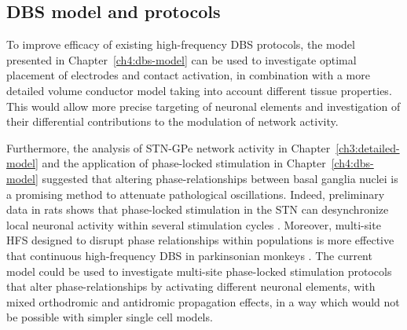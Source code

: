 \subsection{DBS model and protocols}
%

%
%
%
%
%
%
%
%

%
%
%
%
%
%
To improve efficacy of existing high-frequency DBS protocols, the model presented
in Chapter~\eqref{ch4:dbs-model} can be used to investigate optimal placement of
electrodes and contact activation,
in combination with a more detailed volume conductor model taking into account
different tissue properties. This would allow more precise targeting of neuronal
elements and investigation of their differential contributions to the modulation %
of network activity.

Furthermore, the analysis of STN-GPe network activity in Chapter~\ref{ch3:detailed-model}
and the application of phase-locked stimulation in Chapter~\ref{ch4:dbs-model} suggested
that altering phase-relationships between basal ganglia nuclei is a promising
method to attenuate pathological oscillations. Indeed, preliminary data in rats
shows that phase-locked stimulation in the STN can desynchronize local neuronal
activity within several stimulation cycles \cite{holt_phase-dependent_2019}.
Moreover, multi-site HFS designed to disrupt phase relationships within populations
is more effective that continuous high-frequency DBS in parkinsonian monkeys \cite{tass_coordinated_2012}.
The current model could be used to investigate multi-site phase-locked
stimulation protocols that alter phase-relationships by activating different
neuronal elements, with mixed orthodromic and antidromic propagation effects,
in a way which would not be possible with simpler single cell models.


